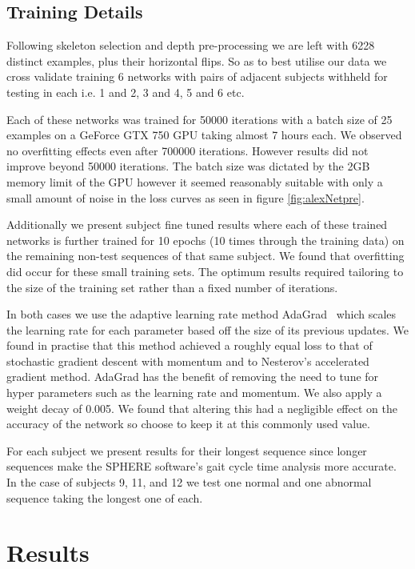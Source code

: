 \documentclass[11pt]{article} %
\begin{document}
\subsection{Training Details}


Following skeleton selection and depth pre-processing we are left with 6228 distinct examples, plus their horizontal flips. So as to best utilise our data we cross validate training 6 networks with pairs of adjacent subjects withheld for testing in each i.e. 1 and 2, 3 and 4, 5 and 6 etc. 

Each of these networks was trained for 50000 iterations with a batch size of 25 examples on a GeForce GTX 750 GPU taking almost 7 hours each. We observed no overfitting effects even after 700000 iterations. However results did not improve beyond 50000 iterations. The batch size was dictated by the 2GB memory limit of the GPU however it seemed reasonably suitable with only a small amount of noise in the loss curves as seen in figure \ref{fig:alexNetpre}.

Additionally we present subject fine tuned results where each of these trained networks is further trained for 10 epochs (10 times through the training data) on the remaining non-test sequences of that same subject. We found that overfitting did occur for these small training sets. The optimum results required tailoring to the size of the training set rather than a fixed number of iterations. 

In both cases we use the adaptive learning rate method AdaGrad~\cite{Duchi2011} which scales the learning rate for each parameter based off the size of its previous updates. We found in practise that this method achieved a roughly equal loss to that of stochastic gradient descent with momentum and to Nesterov's accelerated gradient method. AdaGrad has the benefit of removing the need to tune for hyper parameters such as the learning rate and momentum. We also apply a weight decay of 0.005. We found that altering this had a negligible effect on the accuracy of the network so choose to keep it at this commonly used value.

For each subject we present results for their longest sequence since longer sequences make the SPHERE software's gait cycle time analysis more accurate. In the case of subjects 9, 11, and 12 we test one normal and one abnormal sequence taking the longest one of each. 

\section{Results}
\label{sec:results}
\end{document}
